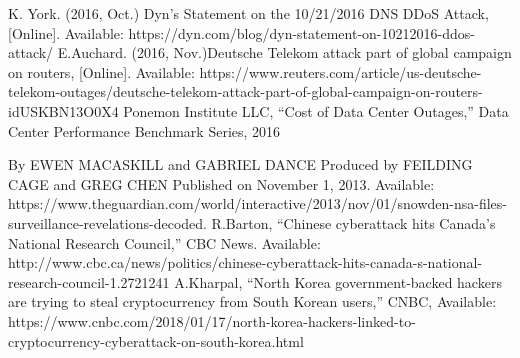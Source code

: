 \documentclass[conference, 11pt]{IEEEtran}
\begin{document}
\begin{thebibliography}{00}


K. York. (2016, Oct.) Dyn’s Statement on the 10/21/2016 DNS DDoS Attack, [Online]. Available: https://dyn.com/blog/dyn-statement-on-10212016-ddos-attack/
E.Auchard. (2016, Nov.)Deutsche Telekom attack part of global campaign on routers, [Online]. Available: https://www.reuters.com/article/us-deutsche-telekom-outages/deutsche-telekom-attack-part-of-global-campaign-on-routers-idUSKBN13O0X4
Ponemon Institute LLC, ``Cost of Data Center Outages,'' Data Center Performance Benchmark Series, 2016 %


 By EWEN MACASKILL and GABRIEL DANCE Produced by FEILDING CAGE and GREG CHEN Published on November 1, 2013. Available: https://www.theguardian.com/world/interactive/2013/nov/01/snowden-nsa-files-surveillance-revelations-decoded.
R.Barton, ``Chinese cyberattack hits Canada's National Research Council,'' CBC News. Available: http://www.cbc.ca/news/politics/chinese-cyberattack-hits-canada-s-national-research-council-1.2721241
A.Kharpal, ``North Korea government-backed hackers are trying to steal cryptocurrency from South Korean users,'' CNBC, Available: https://www.cnbc.com/2018/01/17/north-korea-hackers-linked-to-cryptocurrency-cyberattack-on-south-korea.html




\end{thebibliography}
\end{document}
